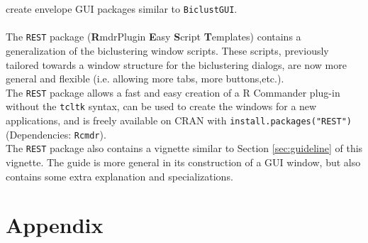\documentclass[a4paper]{article}\usepackage[]{graphicx}\usepackage[]{color}
\begin{document}
create envelope GUI packages similar to \texttt{BiclustGUI}.\\ \\
The \texttt{REST} package ({\bf R}mdrPlugin {\bf E}asy {\bf S}cript {\bf T}emplates) 
contains a generalization of the biclustering window scripts. These scripts, previously tailored towards a 
window structure for the biclustering dialogs, are now more general and flexible (i.e. allowing more tabs, more buttons,etc.).\\
The \texttt{REST} package allows a fast and easy creation of a R Commander
plug-in without the \texttt{tcltk} syntax, can be used to create the windows for
a new applications, and is freely available on CRAN with \texttt{install.packages("REST")} (Dependencies: \texttt{Rcmdr}).\\
The \texttt{REST} package also contains a vignette similar to Section
\ref{sec:guideline} of this vignette. The guide is more general in its
construction of a GUI window, but also contains some extra explanation and
specializations.

\newpage
\nocite{*}




\newpage
\section{Appendix}
\end{document}
